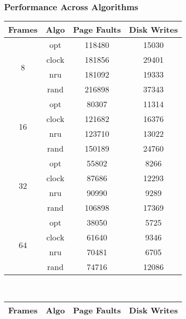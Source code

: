 \documentclass[letterpaper]{article}
\begin{document}
\subsubsection{Performance Across Algorithms}\label{sec:algo}
\begin{table}
\centering
\begin{multicols}{2}
\begin{tabular}{|c|c|c|c|}
\hline
Frames              & Algo  & Page Faults & Disk Writes \\ \hline
\multirow{4}{*}{8}  & opt   & 118480      & 15030       \\ \cline{2-4} 
                    & clock & 181856      & 29401       \\ \cline{2-4} 
                    & nru   & 181092      & 19333       \\ \cline{2-4} 
                    & rand  & 216898      & 37343       \\ \hline
\multirow{4}{*}{16} & opt   & 80307       & 11314       \\ \cline{2-4} 
                    & clock & 121682      & 16376       \\ \cline{2-4} 
                    & nru   & 123710      & 13022       \\ \cline{2-4} 
                    & rand  & 150189      & 24760       \\ \hline
\multirow{4}{*}{32} & opt   & 55802       & 8266        \\ \cline{2-4} 
                    & clock & 87686       & 12293       \\ \cline{2-4} 
                    & nru   & 90990       & 9289        \\ \cline{2-4} 
                    & rand  & 106898      & 17369       \\ \hline
\multirow{4}{*}{64} & opt   & 38050       & 5725        \\ \cline{2-4} 
                    & clock & 61640       & 9346        \\ \cline{2-4} 
                    & nru   & 70481       & 6705        \\ \cline{2-4} 
                    & rand  & 74716       & 12086       \\ \hline
\end{tabular}\smallbreak
{}\columnbreak\\
\begin{tabular}{|c|c|c|c|}
\hline
Frames              & Algo  & Page Faults & Disk Writes \\ \hline

\end{tabular}
\end{multicols}
\end{table}
\end{document}
